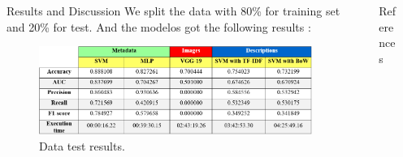 \documentclass[final]{beamer}
\newlength{\sepwid}
\newlength{\onecolwid}
\newlength{\twocolwid}
\begin{document}
\begin{frame}[t]
\begin{columns}[t]
\begin{column}{\twocolwid}
\begin{columns}[t,totalwidth=\twocolwid]
\begin{column}{\onecolwid}
\begin{block}{Results and Discussion}
			 We split the data with 80\% for training set and 20\% for test. And the modelos got	the following results :
				
			
				\begin{figure}
					\includegraphics[width=0.8\linewidth]{resultados.png}
					\caption{Data test results.}
				\end{figure}
				
				
			\end{block}
			
			
		\end{column} %
	\begin{column}{\sepwid}\end{column}
		
		\begin{column}{\onecolwid}\vspace{-.6in} %
			
			
			\begin{block}{References}
			
			\nocite{*} %
			\footnotesize{}
			
			\end{block}
		
			
			
		\end{column} %
		
	\end{columns} %
	

\end{column} %






\begin{column}{\sepwid}\end{column} %



\end{columns} %

\end{frame} %
\end{document}
